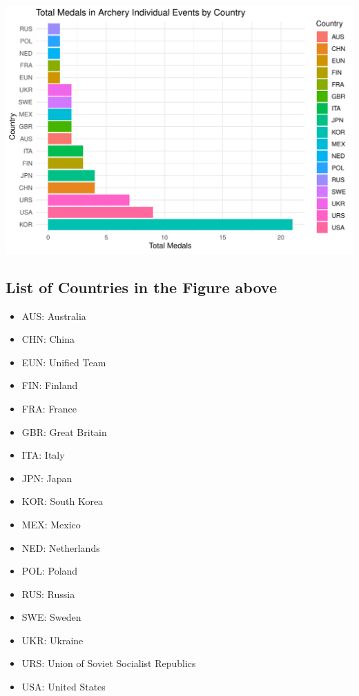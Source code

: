 \documentclass[12pt,preprint, authoryear]{elsarticle}
\let\origfigure\figure
\let\endorigfigure\endfigure
\renewenvironment{figure}[1][2] {
    \expandafter\origfigure\expandafter[H]
} {
    \endorigfigure
}
\numberwithin{equation}{section}
\numberwithin{figure}{section}
\numberwithin{table}{section}
\def\tightlist{} %
\begin{document}
\begin{figure}

{\centering \includegraphics{README_files/figure-latex/unnamed-chunk-4-1} 

}

\caption{The Top Individual Events by Country in Winning Medals in Archery\label{Figure4}}\label{fig:unnamed-chunk-4}
\end{figure}

\hypertarget{list-of-countries-in-the-figure-above}{%
\subsection{List of Countries in the Figure
above}\label{list-of-countries-in-the-figure-above}}

\begin{itemize}
\tightlist
\item
  AUS: Australia
\item
  CHN: China
\item
  EUN: Unified Team
\item
  FIN: Finland
\item
  FRA: France
\item
  GBR: Great Britain
\item
  ITA: Italy
\item
  JPN: Japan
\item
  KOR: South Korea
\item
  MEX: Mexico
\item
  NED: Netherlands
\item
  POL: Poland
\item
  RUS: Russia
\item
  SWE: Sweden
\item
  UKR: Ukraine
\item
  URS: Union of Soviet Socialist Republics
\item
  USA: United States
\end{itemize}
\end{document}
